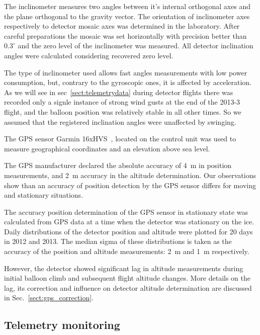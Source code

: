\documentclass[final,5p,times,twocolumn]{elsarticle}
\begin{document}
The inclinometer measures two angles between it's internal orthogonal axes and the plane orthogonal to the gravity vector. The orientation of inclinometer axes respectively to detector mosaic axes was determined in the laboratory. After careful preparations the mosaic was set horizontally with precision better than $0.3^\circ$ and the zero level of the inclinometer was measured. All detector inclination angles were calculated considering recovered zero level.

The type of inclinometer used allows fast angles measurements with low power consumption, but, contrary to the gyroscopic ones, it is affected by acceleration. As we will see in sec~\ref{sect:telemetrydata} during detector flights there was recorded only a signle instance of strong wind gusts at the end of the 2013-3 flight, and the balloon position was relatively stable in all other times. So we assumed that the registered inclination angles were unaffected by swinging.

The GPS sensor Garmin 16xHVS~\cite{GPS-module-specs}, located on the control unit was used to measure geographical coordinates and an elevation above sea level. 

The GPS manufacturer declared the absolute accuracy of 4~m in position measurements, and 2~m accuracy in the altitude determination. Our observations show than an accuracy of position detection by the GPS sensor differs for moving and stationary situations. 

The accuracy position determination of the GPS sensor in stationary state was calculated from GPS data at a time when the detector was stationary on the ice. Daily distributions of the detector position and altitude were plotted for 20 days in 2012 and 2013. The median sigma of these distributions is taken as the accuracy of the position and altitude measurements: 2~m and 1~m respectively.

However, the detector showed significant lag in altitude measurements during initial balloon climb and subsequent flight altitude changes. More details on the lag, its correction and influence on detector altitude determination are discussed in Sec.~\ref{sect:gps_correction}.


\subsection{Telemetry monitoring\label{sect:telemetry}}
\end{document}
